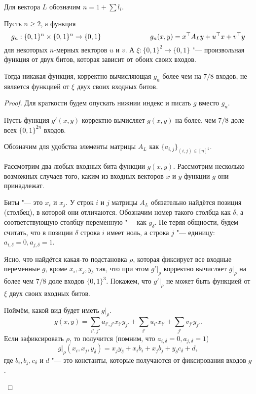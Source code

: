 \documentclass[a4paper, 14pt]{extarticle}
\begin{document}
\begin{lemma} \label{tough}
Для вектора $L$ обозначим $n = 1 + \sum l_i$.

Пусть $n \geq 2$, а функция
\[
g_n : \{0, 1\}^n \times \{0, 1\}^n \to \{0, 1\} \hspace{2.5cm}
g_n(x, y) = x^\top A_L y + u^\top x + v^\top y
\]
для некоторых $n$-мерных векторов $u$ и $v$. А $\xi : \{0, 1\}^2 \to \{0, 1\}$
"--- произвольная функция от двух битов, которая зависит от обоих своих входов.

Тогда никакая функция, корректно вычисляющая $g_n$ более чем на $7/8$ входов, не
является функцией от $\xi$ двух своих входных битов.
\end{lemma}

\begin{proof}
Для краткости будем опускать нижнии индекс и писать $g$ вместо $g_n$.

Пусть функция $g'(x, y)$ корректно вычисляет $g(x, y)$ на более, чем $7/8$ доле
всех $\{0, 1\}^{2n}$ входов.

Обозначим для удобства элементы матрицы $A_L$ как $\{a_{i, j}\}_{(i, j) \in {[n]^2}}$.

Рассмотрим два любых входных бита функции $g(x, y)$. Рассмотрим несколько
возможных случаев того, каким из входных векторов $x$ и $y$ функции $g$ они
принадлежат.
\begin{description}
\item{Биты "--- это $x_i$ и $x_j$.} У строк $i$ и $j$ матрицы $A_L$ обязательно
найдётся позиция (столбец), в которой они отличаются. Обозначим номер такого
столбца как $\delta$, а соответствующую столбцу переменную "--- как $y_\delta$.
Не теряя общности, будем считать, что в позиции $\delta$ строка $i$ имеет ноль,
а строка $j$ "--- единицу: $a_{i, \delta} = 0, a_{j, \delta} = 1$.

Ясно, что найдётся какая-то подстановка $\rho$, которая фиксирует все входные
переменные $g$, кроме $x_i, x_j, y_\delta$ так, что при этом $g' \rvert _ \rho$
корректно вычисляет $g \rvert _ \rho$ на более чем $7/8$ доле входов $\{0,
1\}^3$. Покажем, что $g' \rvert _ \rho$ не может быть функцией от $\xi$ двух своих
входных битов.

Поймём, какой вид будет иметь $g \rvert _ \rho$. 
\[
g(x, y) = \sum_{i', j'} a_{i', j'} x_{i'} y_{j'} + \sum_{i'} u_{i'} x_{i'} + \sum_{j'} v_{j'} y_{j'}.
\]
Если зафиксировать $\rho$, то получится (помним, что $a_{i, \delta} = 0, a_{j, \delta} = 1$)
\[
g \rvert _ \rho (x_i, x_j, y_\delta) = x_j y_\delta + x_i b_i + x_j b_j + y_\delta c_\delta + d,
\]
где $b_i, b_j, c_\delta$ и $d$ "--- это константы, которые получаются от
фиксирования входов $g$.


\end{description}
\end{proof}
\end{document}
